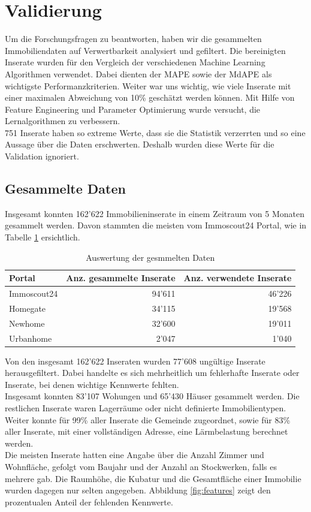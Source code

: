 \section{Validierung}
Um die Forschungsfragen zu beantworten, haben wir die gesammelten Immobiliendaten auf Verwertbarkeit analysiert und gefiltert. Die bereinigten Inserate wurden für den Vergleich der verschiedenen Machine Learning Algorithmen verwendet. Dabei dienten der MAPE sowie der MdAPE als wichtigste Performanzkriterien. Weiter war uns wichtig, wie viele Inserate mit einer maximalen Abweichung von 10\% geschätzt werden können. Mit Hilfe von Feature Engineering und Parameter Optimierung wurde versucht, die Lernalgorithmen zu verbessern.\\
751 Inserate haben so extreme Werte, dass sie die Statistik verzerrten und so eine Aussage über die Daten erschwerten. Deshalb wurden diese Werte für die Validation ignoriert.

\subsection{Gesammelte Daten}
Insgesamt konnten 162'622 Immobilieninserate in einem Zeitraum von 5 Monaten gesammelt werden. Davon stammten die meisten vom Immoscout24 Portal, wie in Tabelle \ref{tab:crawled_data} ersichtlich.

\begin{table}[ht]
\centering
{}
\begin{tabular}{@{}lrr@{}}
\toprule
Portal &  Anz. gesammelte Inserate & Anz. verwendete Inserate \\
\midrule
Immoscout24 & 94'611 & 46'226\\
Homegate & 34'115 & 19'568\\
Newhome & 32'600 & 19'011\\
Urbanhome & 2'047 & 1'040\\
\bottomrule
\end{tabular}
\caption{Auswertung der gesmmelten Daten}
\label{tab:crawled_data}
\end{table}

Von den insgesamt 162'622 Inseraten wurden 77’608 ungültige Inserate herausgefiltert.
Dabei handelte es sich mehrheitlich um fehlerhafte Inserate oder Inserate, bei denen wichtige Kennwerte fehlten.\\
Insgesamt konnten 83’107 Wohungen und 65’430 Häuser gesammelt werden. Die restlichen Inserate waren Lagerräume oder nicht definierte Immobilien\-typen.\\
Weiter konnte für 99\% aller Inserate die Gemeinde zugeordnet, sowie für 83\% aller Inserate, mit einer vollständigen Adresse, eine Lärmbelastung berechnet werden.\\
Die meisten Inserate hatten eine Angabe über die Anzahl Zimmer und Wohnfläche, gefolgt vom Baujahr und der Anzahl an Stockwerken, falls es mehrere gab. Die Raumhöhe, die Kubatur und die Gesamtfläche einer Immobilie wurden dagegen nur selten angegeben. Abbildung \ref{fig:features} zeigt den prozentualen Anteil der fehlenden Kennwerte.

